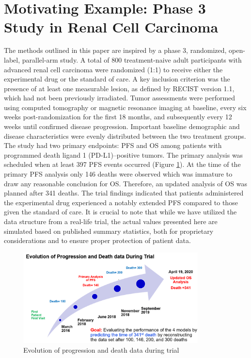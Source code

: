 \section{Motivating Example: Phase 3 Study in Renal Cell Carcinoma} \label{sec:example}
The methods outlined in this paper are inspired by a phase 3, randomized, open-label, parallel-arm study. A total of 800 treatment-naive adult participants with advanced renal cell carcinoma were randomized (1:1) to receive either the experimental drug or the standard of care. A key inclusion criterion was the presence of at least one measurable lesion, as defined by \ac{RECIST} version 1.1, which had not been previously irradiated. Tumor assessments were performed using computed tomography or magnetic resonance imaging at baseline, every six weeks post-randomization for the first 18 months, and subsequently every 12 weeks until confirmed disease progression. Important baseline demographic and disease characteristics were evenly distributed between the two treatment groups. The study had two primary endpoints: \ac{PFS} and \ac{OS} among patients with programmed death ligand 1 (PD-L1)–positive tumors. The primary analysis was scheduled when at least 397 \ac{PFS} events occurred (Figure \ref{fig:evolution}). At the time of the primary \ac{PFS} analysis only 146 deaths were observed which was immature to draw any reasonable conclusion for OS. Therefore, an updated analysis of \ac{OS} was planned after 341 deaths. The trial findings indicated that patients administered the experimental drug experienced a notably extended \ac{PFS} compared to those given the standard of care. It is crucial to note that while we have utilized the data structure from a real-life trial, the actual values presented here are simulated based on published summary statistics, both for proprietary considerations and to ensure proper protection of patient data.

\begin{figure}
    \centering
    \includegraphics[width=0.85\textwidth]{chapters/figures/Evolution.png}
    \caption{Evolution of progression and death data during trial\label{fig:evolution}}
\end{figure}



